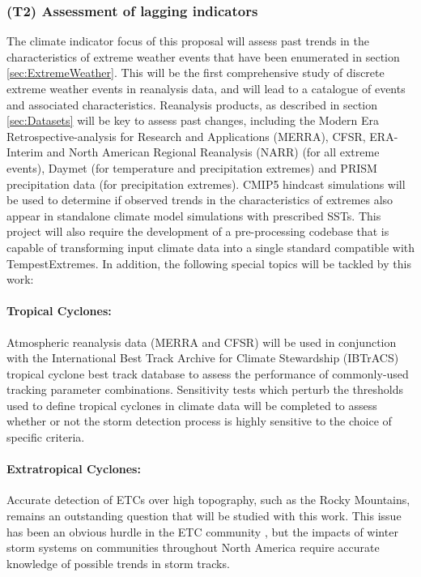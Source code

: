 \documentclass[11pt]{article}
\newcommand\citep{\cite}
\begin{document}
\subsubsection{(T2) Assessment of lagging indicators} \label{sec:T2}

The climate indicator focus of this proposal will assess past trends in the characteristics of extreme weather events that have been enumerated in section \ref{sec:ExtremeWeather}.  This will be the first comprehensive study of discrete extreme weather events in reanalysis data, and will lead to a catalogue of events and associated characteristics.  Reanalysis products, as described in section \ref{sec:Datasets} will be key to assess past changes, including the Modern Era Retrospective-analysis for Research and Applications (MERRA), CFSR, ERA-Interim and North American Regional Reanalysis (NARR) (for all extreme events), Daymet (for temperature and precipitation extremes) and PRISM precipitation data (for precipitation extremes).  CMIP5 hindcast simulations will be used to determine if observed trends in the characteristics of extremes also appear in standalone climate model simulations with prescribed SSTs.  This project will also require the development of a pre-processing codebase that is capable of transforming input climate data into a single standard compatible with TempestExtremes.  In addition, the following special topics will be tackled by this work:

\paragraph{Tropical Cyclones:}  Atmospheric reanalysis data (MERRA and CFSR) will be used in conjunction with the International Best Track Archive for Climate Stewardship (IBTrACS) tropical cyclone best track database \citep{Knapp2010} to assess the performance of commonly-used tracking parameter combinations. Sensitivity tests which perturb the thresholds used to define tropical cyclones in climate data will be completed to assess whether or not the storm detection process is highly sensitive to the choice of specific criteria.

\paragraph{Extratropical Cyclones:}  Accurate detection of ETCs over high topography, such as the Rocky Mountains, remains an outstanding question that will be studied with this work.  This issue has been an obvious hurdle in the ETC community \cite{neu2013imilast}, but the impacts of winter storm systems on communities throughout North America require accurate knowledge of possible trends in storm tracks.
\end{document}
